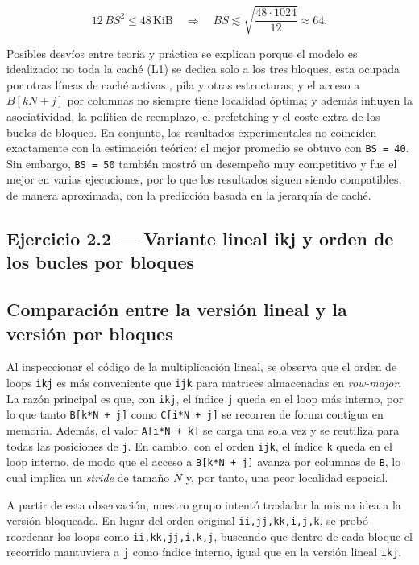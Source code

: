 \documentclass[11pt,a4paper]{article}
\begin{document}
\[
12\,BS^2 \leq 48\,\text{KiB} \quad \Rightarrow \quad BS \lesssim \sqrt{\frac{48 \cdot 1024}{12}} \approx 64.
\]

Posibles desvíos entre teoría y práctica se explican porque el modelo es idealizado: no toda la caché (L1) se dedica solo a los tres bloques, esta ocupada por otras líneas de caché activas , pila y otras estructuras; y  el acceso a \(B[kN+j]\) por columnas no siempre tiene localidad óptima; y además influyen la asociatividad, la política de reemplazo, el prefetching y el coste extra de los bucles de bloqueo. En conjunto, los resultados experimentales no coinciden exactamente con la estimación teórica: el mejor promedio se obtuvo con \texttt{BS = 40}. Sin embargo, \texttt{BS = 50} también mostró un desempeño muy competitivo y fue el mejor en varias ejecuciones, por lo que los resultados siguen siendo compatibles, de manera aproximada, con la predicción basada en la jerarquía de caché.

\subsection*{Ejercicio 2.2 --- Variante lineal ikj y orden de los bucles por bloques}

\subsection*{Comparación entre la versión lineal y la versión por bloques}

Al inspeccionar el código de la multiplicación lineal, se observa que el orden de loops \texttt{ikj} es más conveniente que \texttt{ijk} para matrices almacenadas en \emph{row-major}. La razón principal es que, con \texttt{ikj}, el índice \texttt{j} queda en el loop más interno, por lo que tanto \texttt{B[k*N + j]} como \texttt{C[i*N + j]} se recorren de forma contigua en memoria. Además, el valor \texttt{A[i*N + k]} se carga una sola vez y se reutiliza para todas las posiciones de \texttt{j}. En cambio, con el orden \texttt{ijk}, el índice \texttt{k} queda en el loop interno, de modo que el acceso a \texttt{B[k*N + j]} avanza por columnas de \texttt{B}, lo cual implica un \emph{stride} de tamaño \(N\) y, por tanto, una peor localidad espacial.


A partir de esta observación, nuestro grupo intentó trasladar la misma idea a la versión bloqueada. En lugar del orden original \texttt{ii,jj,kk,i,j,k}, se probó reordenar los loops como \texttt{ii,kk,jj,i,k,j}, buscando que dentro de cada bloque el recorrido mantuviera a \texttt{j} como índice interno, igual que en la versión lineal \texttt{ikj}.
\end{document}
